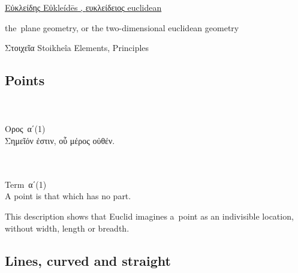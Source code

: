 \section{}

\href{https://el.wikipedia.org/wiki/%CE%95%CF%85%CE%BA%CE%BB%CE%B5%CE%AF%CE%B4%CE%B7%CF%82}{%
\textgreek{Εὐκλείδης}
Eὐkleídēs
,
\textgreek{ευκλείδειος}
euclidean %
}

the~plane geometry, or the two\hbox{-}dimensional euclidean geometry

\textgreek{Στοιχεῖα}
Stoikheîa
Elements, Principles

\vspace{.5em}

\subsection{Points}

{\small
\setlength{\parindent}{0pt}

\nopagebreak%
\begin{multicols}{2}
%
\\
\\[.3em]
\textgreek{Ορος}~\textgreek{α΄}\:(1)\\[.1em]
\textgreek{Σημεῖόν ἐστιν, οὗ μέρος οὐθέν.}

\columnbreak
%
\\
\\[.3em]
Term~\textgreek{α΄}\:(1)\\[.1em]
A point is that which has no part.
%
\end{multicols}
\par}

This description
shows that
Euclid imagines a~point
as
an indivisible location,
without width,
length
or
breadth.

\subsection{Lines, curved and straight}

